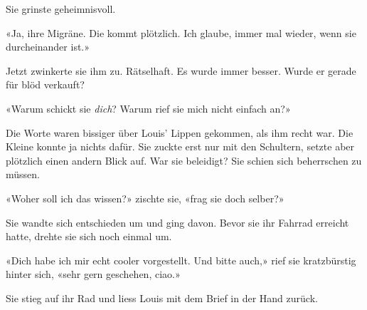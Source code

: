 Sie grinste geheimnisvoll.

«Ja, ihre Migräne. Die kommt plötzlich. Ich glaube, immer mal wieder,
wenn sie durcheinander ist.»

Jetzt zwinkerte sie ihm zu. Rätselhaft. Es wurde immer besser.
Wurde er gerade für blöd verkauft?

«Warum schickt sie \emph{dich}? Warum rief sie mich nicht einfach an?»

Die Worte waren bissiger über Louis’ Lippen gekommen, als ihm recht war.
Die Kleine konnte ja nichts dafür.
Sie zuckte erst nur mit den Schultern, setzte aber plötzlich einen
andern Blick auf. War sie beleidigt?
Sie schien sich beherrschen zu müssen.

«Woher soll ich das wissen?» zischte sie, «frag sie doch selber?»

Sie wandte sich entschieden um und ging davon. Bevor sie ihr Fahrrad
erreicht hatte, drehte sie sich noch einmal um.

«Dich habe ich mir echt cooler vorgestellt. Und bitte auch,» rief sie
kratzbürstig hinter sich, «sehr gern geschehen, ciao.»

Sie stieg auf ihr Rad und liess Louis mit dem Brief in der Hand zurück.
